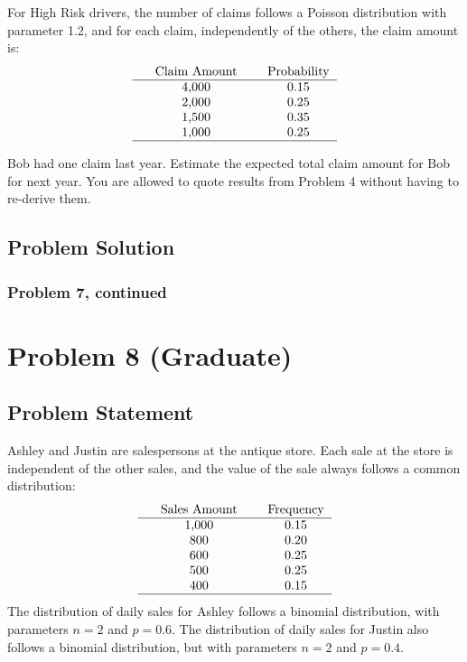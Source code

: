 \documentclass[12pt]{article}
\theoremstyle{definition}
\begin{document}
\bigskip
For High Risk drivers, the number of claims follows a Poisson distribution with parameter 1.2, and for each claim, independently of the others, the claim amount is:
$$
\begin{tabular}{ccccc}
& Claim Amount & & Probability\\
\hline
& 4,000 & & 0.15\\
& 2,000 & & 0.25\\
& 1,500 & & 0.35\\
& 1,000 & & 0.25\\
\hline
\end{tabular}
$$

\bigskip
Bob had one claim last year. Estimate the expected total claim amount for Bob for next year. You are allowed to quote results from Problem 4 without having to re-derive them.


\subsection*{Problem Solution}



\newpage
\subsubsection*{Problem 7, continued}






\newpage
\section*{Problem 8 (Graduate)}


\subsection*{Problem Statement}

Ashley and Justin are salespersons at the antique store. Each sale at the store is independent of the other sales, and the value of the sale always follows a common distribution:
$$
\begin{tabular}{ccccc}
&  Sales Amount & & Frequency\\
\hline
& 1,000 & & 0.15\\
& 800 & & 0.20\\
& 600 & & 0.25\\
& 500 & & 0.25\\
& 400 & & 0.15\\
\hline
\end{tabular}
$$
The distribution of daily sales for Ashley follows a binomial distribution, with parameters $n = 2$ and $p = 0.6$. The distribution of daily sales for Justin also follows a binomial distribution, but with parameters $n = 2$ and $p = 0.4$.
\end{document}
